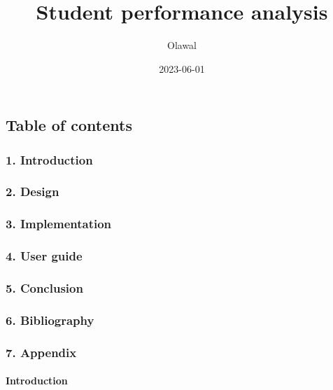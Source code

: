 \documentclass[
]{article}
\title{Student performance analysis}
\author{Olawal}
\date{2023-06-01}
\begin{document}
\maketitle

\hypertarget{table-of-contents}{%
\subsection{Table of contents}\label{table-of-contents}}

\hypertarget{introduction}{%
\subsubsection{1. Introduction}\label{introduction}}

\hypertarget{design}{%
\subsubsection{2. Design}\label{design}}

\hypertarget{implementation}{%
\subsubsection{3. Implementation}\label{implementation}}

\hypertarget{user-guide}{%
\subsubsection{4. User guide}\label{user-guide}}

\hypertarget{conclusion}{%
\subsubsection{5. Conclusion}\label{conclusion}}

\hypertarget{bibliography}{%
\subsubsection{6. Bibliography}\label{bibliography}}

\hypertarget{appendix}{%
\subsubsection{7. Appendix}\label{appendix}}

\newpage

\hypertarget{introduction-1}{%
\paragraph{Introduction}\label{introduction-1}}
\end{document}
